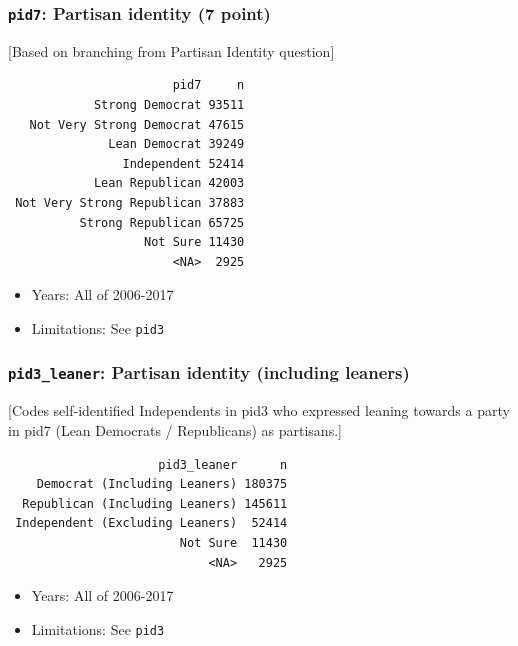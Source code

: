 \documentclass[10pt,article,oneside]{memoir}
\theoremstyle{definition}
\begin{document}
\hypertarget{pid7-partisan-identity-7-point}{%
\subsubsection{\texorpdfstring{\texttt{pid7}: Partisan identity (7
point)}{pid7: Partisan identity (7 point)}}\label{pid7-partisan-identity-7-point}}

{[}Based on branching from Partisan Identity question{]}

\begin{verbatim}
                       pid7     n
            Strong Democrat 93511
   Not Very Strong Democrat 47615
              Lean Democrat 39249
                Independent 52414
            Lean Republican 42003
 Not Very Strong Republican 37883
          Strong Republican 65725
                   Not Sure 11430
                       <NA>  2925
\end{verbatim}

\begin{itemize}
\tightlist
\item
  Years: All of 2006-2017
\item
  Limitations: See \texttt{pid3}
\end{itemize}

\hypertarget{pid3_leaner-partisan-identity-including-leaners}{%
\subsubsection{\texorpdfstring{\texttt{pid3\_leaner}: Partisan identity
(including
leaners)}{pid3\_leaner: Partisan identity (including leaners)}}\label{pid3_leaner-partisan-identity-including-leaners}}

{[}Codes self-identified Independents in pid3 who expressed leaning
towards a party in pid7 (Lean Democrats / Republicans) as partisans.{]}

\begin{verbatim}
                     pid3_leaner      n
    Democrat (Including Leaners) 180375
  Republican (Including Leaners) 145611
 Independent (Excluding Leaners)  52414
                        Not Sure  11430
                            <NA>   2925
\end{verbatim}

\begin{itemize}
\tightlist
\item
  Years: All of 2006-2017
\item
  Limitations: See \texttt{pid3}
\end{itemize}
\end{document}
